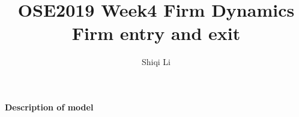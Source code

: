 \documentclass[12pt]{article}
\begin{document}

\setlength{\droptitle}{0pt}
\title{OSE2019 Week4 Firm Dynamics \\
Firm entry and exit}%
\author{\vspace{0pt} Shiqi Li} %
\date{}

\maketitle

\textbf{Description of model} \par
\end{document}
